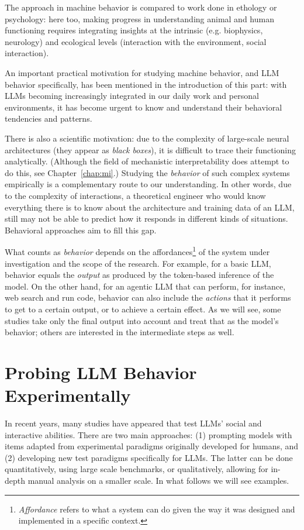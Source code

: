 The approach in machine behavior is compared to work done in ethology or psychology: here too, making progress in understanding animal and human functioning requires integrating insights at the intrinsic (e.g. biophysics, neurology) and ecological levels (interaction with the environment, social interaction). 

An important practical motivation for studying machine behavior, and LLM behavior specifically, has been mentioned in the introduction of this part: with LLMs becoming increasingly integrated in our daily work and personal environments, it has become urgent to know and understand their behavioral tendencies and patterns. 

There is also a scientific motivation: due to the complexity of large-scale neural architectures (they appear as {\em black boxes}), it is difficult to trace their functioning analytically. 
(Although the field of mechanistic interpretability does attempt to do this, see Chapter~\ref{chap:mi}.) Studying the {\em behavior} of such complex systems empirically is a complementary route to our understanding. In other words, due to the complexity of interactions, a theoretical engineer who would know everything there is to know about the architecture and training data of an LLM, still may not be able to predict how it responds in different kinds of situations. Behavioral approaches aim to fill this gap.

What counts as \emph{behavior} depends on the affordances\footnote{{\em Affordance} refers to what a system can do given the way it was designed and implemented in a specific context.} of the system under investigation and the scope of the research. For example, for a basic LLM, behavior equals the {\em output} as produced by the token-based inference of the model. On the other hand, for an agentic LLM that can perform, for instance, web search and run code, behavior can also include the {\em actions} that it performs to get to a certain output, or to achieve a certain effect. 
As we will see, some studies take only the final output into account and treat that as the model's behavior; others are interested in the intermediate steps as well.

\section{Probing LLM Behavior Experimentally}
In recent years, many studies have appeared that test LLMs' social and interactive abilities. There are two main approaches: (1) prompting models with items adapted from experimental paradigms originally developed for humans, and (2)  developing new test paradigms specifically for LLMs. The latter can be done quantitatively, using large scale benchmarks, or qualitatively, allowing for in-depth manual analysis on a smaller scale.
In what follows we will see examples.

